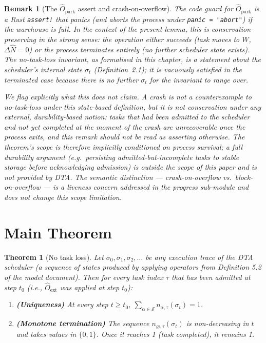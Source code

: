 \documentclass[11pt,a4paper]{report}
\newtheorem{theorem}{Theorem}[section]
\newtheorem{remark}{Remark}[section]
\newcommand{\Num}{\hat{N}}
\newcommand{\code}[1]{\texttt{#1}}
\begin{document}
\begin{remark}[The $\hat{O}_{\text{park}}$ assert and crash-on-overflow]
\label{rem:crash-vacuous}
The code guard for $\hat{O}_{\text{park}}$ is a Rust \code{assert!}
that panics (and aborts the process under \code{panic = "abort"}) if
the warehouse is full.  In the context of the present lemma, this is
\emph{conservation-preserving in the strong sense}: the operation
either succeeds (task moves to $W$, $\Delta\Num = 0$) or the process
terminates entirely (no further scheduler state exists).  The
no-task-loss invariant, as formalised in this chapter, is a statement
about the \emph{scheduler's internal state} $\sigma_t$ (Definition~2.1);
it is vacuously satisfied in the terminated case because there is no
further $\sigma_t$ for the invariant to range over.

We flag explicitly what this does \emph{not} claim.  A crash is not a
counterexample to no-task-loss under this state-based definition, but it
is not conservation under any external, \emph{durability}-based notion:
tasks that had been admitted to the scheduler and not yet completed at
the moment of the crash are unrecoverable once the process exits, and
this remark should not be read as asserting otherwise. The theorem's
scope is therefore implicitly conditioned on \emph{process survival}; a
full durability argument (e.g.\ persisting admitted-but-incomplete tasks
to stable storage before acknowledging admission) is outside the scope
of this paper and is not provided by DTA.  The semantic distinction
--- crash-on-overflow vs.\ block-on-overflow --- is a \emph{liveness}
concern addressed in the progress sub-module and does not change this
scope limitation.
\end{remark}

\section{Main Theorem}

\begin{theorem}[No task loss]
\label{thm:ntl}
Let $\sigma_0, \sigma_1, \sigma_2, \ldots$ be any execution trace of
the DTA scheduler (a sequence of states produced by applying
operators from Definition 5.2 of the model document).  Then for every
task index $\tau$ that has been admitted at step $t_0$
(i.e., $\hat{O}_{\text{ext}}$ was applied at step $t_0$):

\begin{enumerate}
  \item \textbf{(Uniqueness)} At every step $t \geq t_0$,
        $\sum_{\alpha \in \mathcal{S}} n_{\alpha,\tau}(\sigma_t) = 1$.

  \item \textbf{(Monotone termination)} The sequence
        $n_{\varnothing,\tau}(\sigma_t)$ is non-decreasing in $t$
        and takes values in $\{0, 1\}$.  Once it reaches 1
        (task completed), it remains 1.
\end{enumerate}
\end{theorem}
\end{document}
